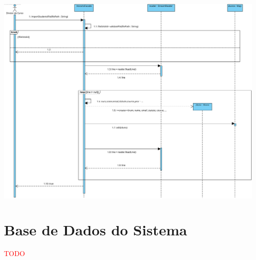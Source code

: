 \documentclass[a4paper,12pt]{scrreprt}
\begin{document}
\begin{minipage}{\textwidth}
    \centering
    \includegraphics[width=1\textwidth]{images/sequence-diagrams/3-importar-alunos.png}
    \label{fig:7-3-diagrama_de_sequencia_importar_alunos}
\end{minipage}



\chapter{Base de Dados do Sistema}
\vspace{1cm}

\textcolor{red}{TODO}


\end{document}
